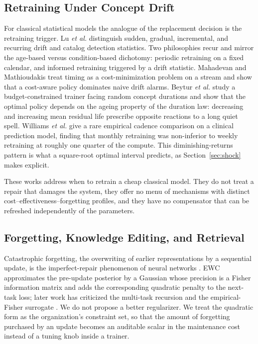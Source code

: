 \documentclass[journal]{IEEEtran}
\begin{document}
\subsection{Retraining Under Concept Drift}
For classical statistical models the analogue of the replacement decision is the retraining trigger. Lu \emph{et al.} \cite{lu2019} distinguish sudden, gradual, incremental, and recurring drift and catalog detection statistics. Two philosophies recur and mirror the age-based versus condition-based dichotomy: periodic retraining on a fixed calendar, and informed retraining triggered by a drift statistic. Mahadevan and Mathioudakis \cite{mahadevan2023} treat timing as a cost-minimization problem on a stream and show that a cost-aware policy dominates naive drift alarms. Beytur \emph{et al.} \cite{beytur2025} study a budget-constrained trainer facing random concept durations and show that the optimal policy depends on the ageing property of the duration law: decreasing and increasing mean residual life prescribe opposite reactions to a long quiet spell. Williams \emph{et al.} \cite{williams2026} give a rare empirical cadence comparison on a clinical prediction model, finding that monthly retraining was non-inferior to weekly retraining at roughly one quarter of the compute. This diminishing-returns pattern is what a square-root optimal interval predicts, as Section~\ref{sec:shock} makes explicit.

These works address when to retrain a cheap classical model. They do not treat a repair that damages the system, they offer no menu of mechanisms with distinct cost--effectiveness--forgetting profiles, and they have no compensator that can be refreshed independently of the parameters.

\subsection{Forgetting, Knowledge Editing, and Retrieval}
Catastrophic forgetting, the overwriting of earlier representations by a sequential update, is the imperfect-repair phenomenon of neural networks \cite{kirkpatrick2017,shi2024,luo2023}. EWC approximates the pre-update posterior by a Gaussian whose precision is a Fisher information matrix and adds the corresponding quadratic penalty to the next-task loss; later work has criticized the multi-task recursion and the empirical-Fisher surrogate \cite{huszar2018,kunstner2019}. We do not propose a better regularizer. We treat the quadratic form as the organization's constraint set, so that the amount of forgetting purchased by an update becomes an auditable scalar in the maintenance cost instead of a tuning knob inside a trainer.
\end{document}
